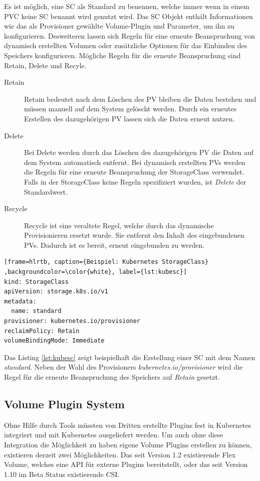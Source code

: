 Es ist möglich, eine \ac{SC} als Standard zu benennen, welche immer wenn in einem \ac{PVC} keine \ac{SC} benannt wird genutzt wird.
Das \ac{SC} Objekt enthält Informationen wie das als Provisioner gewählte Volume-Plugin und Parameter, um ihn zu konfigurieren. Desweiteren lassen sich Regeln für eine erneute Beanspruchung von dynamisch erstellten Volumen oder zusätzliche Optionen für das Einbinden des Speichers konfigurieren. Mögliche Regeln für die erneute Beanspruchung sind Retain, Delete und Recyle.
\begin{description}
\item[Retain]
Retain bedeutet nach dem Löschen des \ac{PV} bleiben die Daten bestehen und müssen manuell auf dem System gelöscht werden. Durch ein erneutes Erstellen des dazugehörigen \ac{PV} lassen sich die Daten erneut nutzen.
\item[Delete]
Bei Delete werden durch das Löschen des dazugehörigen \ac{PV} die Daten auf dem System automatisch entfernt. Bei dynamisch erstellten \ac{PV}s werden die Regeln für eine erneute Beanspruchung der StorageClass verwendet. Falls in der StorageClass keine Regeln spezifiziert wurden, ist \textit{Delete} der Standardwert.
\item[Recycle]
Recycle ist eine veraltete Regel, welche durch das dynamische Provisionieren ersetzt wurde. Sie entfernt den Inhalt des eingebundenen \ac{PV}s. Dadurch ist es bereit, erneut eingebunden zu werden.
\end{description}
\lstset{language=yaml}
\begin{lstlisting}[frame=hlrtb, caption={Beispiel: Kubernetes StorageClass}
,backgroundcolor=\color{white}, label={lst:kubesc}]
kind: StorageClass
apiVersion: storage.k8s.io/v1
metadata:
  name: standard
provisioner: kubernetes.io/provisioner
reclaimPolicy: Retain
volumeBindingMode: Immediate
\end{lstlisting}
Das Listing \ref{lst:kubesc} zeigt beispielhaft die Erstellung einer \ac{SC} mit dem Namen \textit{standard}. Neben der Wahl des Provisioners \textit{kubernetes.io/provisioner} wird die Regel für die erneute Beanspruchung des Speichers auf \textit{Retain} gesetzt.

\subsection{Volume Plugin System}
Ohne Hilfe durch Tools müssten von Dritten erstellte Plugins fest in Kubernetes integriert und mit Kubernetes ausgeliefert werden. Um auch ohne diese Integration die Möglichkeit zu haben eigene Volume Plugins erstellen zu können, existieren derzeit zwei Möglichkeiten. Das seit Version 1.2 existierende Flex Volume, welches eine \ac{API} für externe Plugins bereitstellt, oder das seit Version 1.10 im Beta Status existierende \ac{CSI}.

